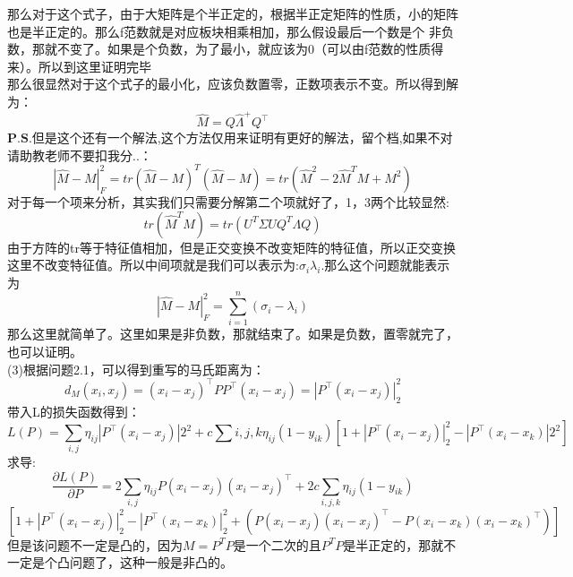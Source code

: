 \documentclass[answers]{exam}  %
\begin{document}
\begin{questions}
\begin{solution}
\begin{parts}
    那么对于这个式子，由于大矩阵是个半正定的，根据半正定矩阵的性质，小的矩阵也是半正定的。那么f范数就是对应板块相乘相加，那么假设最后一个数是个
    非负数，那就不变了。如果是个负数，为了最小，就应该为0（可以由f范数的性质得来）。所以到这里证明完毕\\
    那么很显然对于这个式子的最小化，应该负数置零，正数项表示不变。所以得到解为：\\
    \[
        \hat{M} = Q \hat{\Lambda}^+ Q^\top
    \]  
    $\boldsymbol{P.S}$.但是这个还有一个解法,这个方法仅用来证明有更好的解法，留个档,如果不对请助教老师不要扣我分..：\\
    \[
        |\hat{M} - M|_F^2  = tr(\hat{M} - M)^T(\hat{M} - M) = tr(\hat{M}^2 - 2\hat{M}^T M + M^2)
    \]
    对于每一个项来分析，其实我们只需要分解第二个项就好了，1，3两个比较显然:
    \[
        tr(\hat{M}^T M) = tr(U^T \Sigma U Q^T \Lambda Q)
    \]
    由于方阵的tr等于特征值相加，但是正交变换不改变矩阵的特征值，所以正交变换这里不改变特征值。所以中间项就是我们可以表示为:$\sigma_i \lambda_i$.那么这个问题就能表示为\\
    \[
        |\hat{M} - M|_F^2 = \sum_{i=1}^{n} (\sigma_i - \lambda_i)
    \]
    那么这里就简单了。这里如果是非负数，那就结束了。如果是负数，置零就完了，也可以证明。\\
    (3)根据问题2.1，可以得到重写的马氏距离为：
    \[
        d_M(x_i, x_j) = (x_i - x_j)^\top P P^\top (x_i - x_j) = |P^\top (x_i - x_j)|_2^2
    \]
    带入L的损失函数得到：
    \[
        L(P) = \sum_{i,j} \eta_{ij} |P^\top (x_i - x_j)|2^2 + c \sum{i,j,k} \eta_{ij} (1 - y_{ik}) [1 + |P^\top (x_i - x_j)|_2^2 - |P^\top (x_i - x_k)|2^2]
    \]
    求导:
    \[
        \frac{\partial L(P)}{\partial P} = 2 \sum_{i,j} \eta_{ij} P (x_i - x_j)(x_i - x_j)^\top + 2c \sum_{i,j,k} \eta_{ij} (1 - y_{ik}) 
    \]
    \[
        [1 + |P^\top (x_i - x_j)|_2^2 - |P^\top (x_i - x_k)|_2^2+ \left( P (x_i - x_j)(x_i - x_j)^\top - P (x_i - x_k)(x_i - x_k)^\top \right) ]
    \]
    但是该问题不一定是凸的，因为$M  = P^T P$是一个二次的且$P^TP$是半正定的，那就不一定是个凸问题了，这种一般是非凸的。
\end{parts}
\end{solution}

\end{questions}
\end{document}

